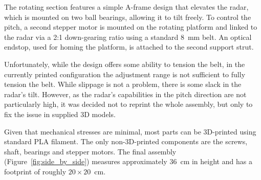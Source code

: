 The rotating section features a simple A-frame design that elevates the radar, which is mounted on two ball bearings, allowing it to tilt freely.
To control the pitch, a second stepper motor is mounted on the rotating platform and linked to the radar via a 2:1 down-gearing ratio using a standard 8~mm belt.
An optical endstop, used for homing the platform, is attached to the second support strut.

Unfortunately, while the design offers some ability to tension the belt, in the currently printed configuration the adjustment range is not sufficient to fully tension the belt.
While slippage is not a problem, there is some slack in the radar's tilt.
However, as the radar's capabilities in the pitch direction are not particularly high, it was decided not to reprint the whole assembly, but only to fix the issue in supplied 3D models.

Given that mechanical stresses are minimal, most parts can be 3D-printed using standard PLA filament.
The only non-3D-printed components are the screws, shaft, bearings and stepper motors.
The final assembly (Figure~\ref{fig:side_by_side}) measures approximately 36~cm in height and has a footprint of roughly $20\times20$~cm.

